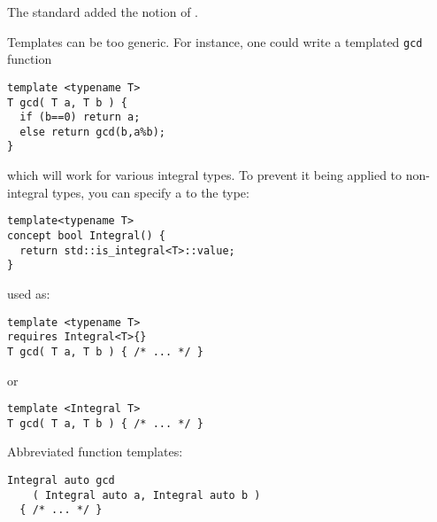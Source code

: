 The  standard added the notion of .

Templates can be too generic. For instance, one could write a
templated \lstinline{gcd} function
\begin{lstlisting}
template <typename T>
T gcd( T a, T b ) {
  if (b==0) return a;
  else return gcd(b,a%b);
}
\end{lstlisting}
which will work for various integral types. To prevent it being
applied to non-integral types, you can specify a 
to the type:
\begin{lstlisting}
template<typename T>
concept bool Integral() {
  return std::is_integral<T>::value;
}
\end{lstlisting}
used as:
\begin{lstlisting}
template <typename T>
requires Integral<T>{}
T gcd( T a, T b ) { /* ... */ }
\end{lstlisting}
or
\begin{lstlisting}
template <Integral T>
T gcd( T a, T b ) { /* ... */ }
\end{lstlisting}
Abbreviated function templates:
\begin{lstlisting}
Integral auto gcd
    ( Integral auto a, Integral auto b )
  { /* ... */ }
\end{lstlisting}

\endinput

\Level 0 {Templating over non-types}

THESE EXAMPLES ARE NOT GOOD.

See:
\url{https://www.codeproject.com/Articles/257589/An-Idiots-Guide-to-Cplusplus-Templates-Part}

\begin{block}{Templating a value}
  Templating over integral types, not double.

  The templated quantity is a value:
  \verbatimsnippet{itemplate}
\end{block}

\begin{exercise}
  Write a class that contains an array. The length of the array should
  be templated.
\end{exercise}
